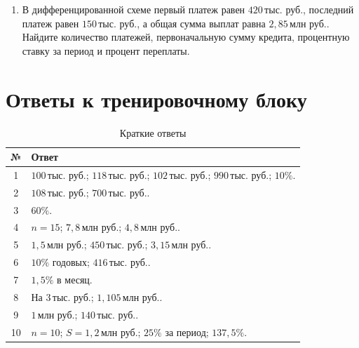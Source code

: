 \documentclass[a4paper,12pt]{article}
\newcommand{\mln}{\,\text{млн руб.}}
\newcommand{\thousand}{\,\text{тыс. руб.}}
\begin{document}
\begin{enumerate}[
  leftmargin=1.8em,
  label=\textbf{\arabic*.},
  start=10,
  itemsep=0.9em
]
  \item В дифференцированной схеме первый платеж равен
        $420\thousand$, последний платеж равен $150\thousand$,
        а общая сумма выплат равна $2{,}85\mln$. Найдите количество
        платежей, первоначальную сумму кредита, процентную ставку
        за период и процент переплаты.
\end{enumerate}

\clearpage

\section*{Ответы к тренировочному блоку}

\begin{table}[ht]
\centering
\caption{Краткие ответы}
\begin{tabularx}{\linewidth}{@{}cX@{}}
\toprule
№ & Ответ \\
\midrule
1 &
$100\thousand$;
$118\thousand$;
$102\thousand$;
$990\thousand$;
$10\%$.
\\

2 &
$108\thousand$;
$700\thousand$.
\\

3 &
$60\%$.
\\

4 &
$n=15$;
$7{,}8\mln$;
$4{,}8\mln$.
\\

5 &
$1{,}5\mln$;
$450\thousand$;
$3{,}15\mln$.
\\

6 &
$10\%$ годовых;
$416\thousand$.
\\

7 &
$1{,}5\%$ в месяц.
\\

8 &
На $3\thousand$;
$1{,}105\mln$.
\\

9 &
$1\mln$;
$140\thousand$.
\\

10 &
$n=10$;
$S=1{,}2\mln$;
$25\%$ за период;
$137{,}5\%$.
\\
\bottomrule
\end{tabularx}
\end{table}
\end{document}
